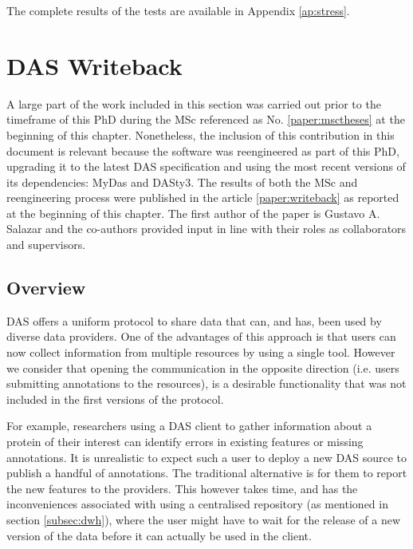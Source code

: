 The complete results of the tests are available in Appendix \ref{ap:stress}.








\section{DAS Writeback}\label{section:writeback}

A large part of the work included in this section was carried out prior to the timeframe of this PhD during the MSc referenced as No. \ref{paper:msctheses} at the beginning of this chapter. Nonetheless, the inclusion of this contribution in this document is relevant because the software was reengineered as part of this PhD, upgrading it to the latest DAS specification and using the most recent versions of its dependencies: MyDas and DASty3. The results of both the MSc and reengineering process were published in the article \ref{paper:writeback} as reported at the beginning of this chapter. The first author of the paper is Gustavo A. Salazar and the co-authors provided input in line with their roles as collaborators and supervisors. 

\subsection{Overview}
DAS offers a uniform protocol to share data that can, and has, been used by diverse data providers. One of the advantages of this approach is that users can now  collect information from multiple resources by using a single tool. However we consider that opening the communication in the opposite direction (i.e. users submitting annotations to the resources), is a desirable functionality that was not included in the first versions of the protocol.

For example, researchers using a DAS client to gather information about a protein of their interest can identify errors in existing features or missing annotations. It is unrealistic to expect such a user to deploy a new DAS source to publish a handful of annotations. The traditional alternative is for them to report the new features to the providers. This however takes time, and has the inconveniences associated with using a centralised repository (as mentioned in section \ref{subsec:dwh}), where the user might have to wait for the release of a new version of the data before it can actually be used in the client.

